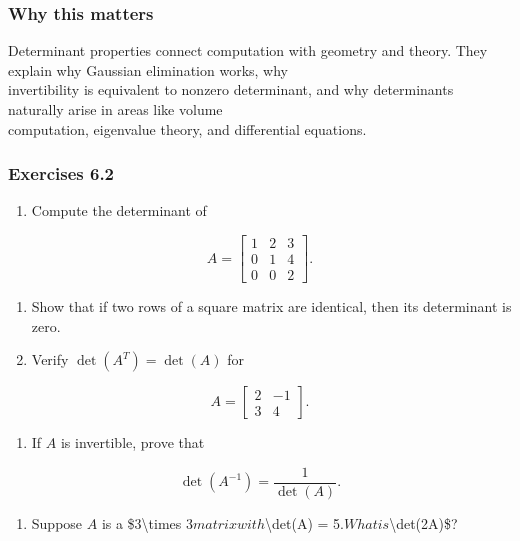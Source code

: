 \documentclass[
  12pt,
  a4paper,
]{article}
\begin{document}
\subsubsection{Why this matters}\label{why-this-matters-21}

Determinant properties connect computation with geometry and theory.
They explain why Gaussian elimination works, why\\
invertibility is equivalent to nonzero determinant, and why determinants
naturally arise in areas like volume\\
computation, eigenvalue theory, and differential equations.

\subsubsection{Exercises 6.2}\label{exercises-62}

\begin{enumerate}
\def\labelenumi{\arabic{enumi}.}
\item
  Compute the determinant of
\end{enumerate}

\[A = \begin{bmatrix} 1 & 2 & 3 \\ 0 & 1 & 4 \\ 0 & 0 & 2 \end{bmatrix}.\]

\begin{enumerate}
\def\labelenumi{\arabic{enumi}.}
\item
  Show that if two rows of a square matrix are identical, then its
  determinant is zero.
\item
  Verify \(\det(A^T) = \det(A)\) for
\end{enumerate}

\[A = \begin{bmatrix} 2 & -1 \\ 3 & 4 \end{bmatrix}.\]

\begin{enumerate}
\def\labelenumi{\arabic{enumi}.}
\item
  If \(A\) is invertible, prove that
\end{enumerate}

\[\det(A^{-1}) = \frac{1}{\det(A)}.\]

\begin{enumerate}
\def\labelenumi{\arabic{enumi}.}
\item
  Suppose \(A\) is a \$3\textbackslash times
  3\( matrix with \)\textbackslash det(A) =
  5\(. What is \)\textbackslash det(2A)\$?
\end{enumerate}
\end{document}
